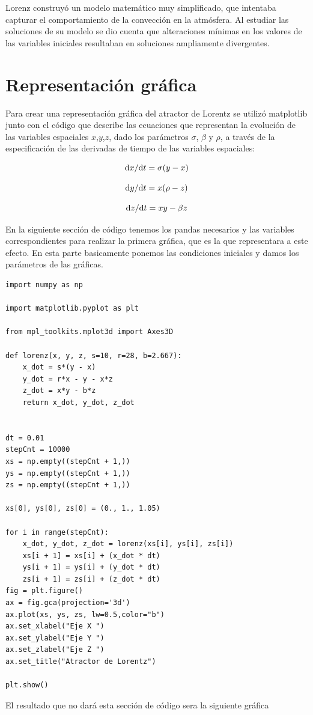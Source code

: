 Lorenz construyó un modelo matemático muy simplificado, que intentaba capturar el comportamiento de la convección en la atmósfera. Al estudiar las soluciones de su modelo se dio cuenta que alteraciones mínimas en los valores de las variables iniciales resultaban en soluciones ampliamente divergentes.
\newpage
\section{Representación gráfica}
\noindent Para crear una representación gráfica del atractor de Lorentz se utilizó matplotlib junto con el código que describe las ecuaciones que representan la evolución de las variables espaciales $x$,$y$,$z$, dado los parámetros $\sigma$, $\beta$ y $\rho$, a través de la especificación de las derivadas de tiempo de las variables espaciales:

$${\rm d}x/{\rm d}t=\sigma(y-x)$$

$${\rm d}y/{\rm d}t=x(\rho-z)$$

$${\rm d}z/{\rm d}t=xy-\beta z$$

En la siguiente sección de código tenemos los pandas necesarios y las variables correspondientes para realizar la primera gráfica, que es la que representara a este efecto. En esta parte basicamente ponemos las condiciones iniciales y damos los parámetros de las gráficas. 

\begin{verbatim}
import numpy as np

import matplotlib.pyplot as plt

from mpl_toolkits.mplot3d import Axes3D

def lorenz(x, y, z, s=10, r=28, b=2.667):
    x_dot = s*(y - x)
    y_dot = r*x - y - x*z
    z_dot = x*y - b*z
    return x_dot, y_dot, z_dot
    

dt = 0.01
stepCnt = 10000
xs = np.empty((stepCnt + 1,))
ys = np.empty((stepCnt + 1,))
zs = np.empty((stepCnt + 1,))

xs[0], ys[0], zs[0] = (0., 1., 1.05)

for i in range(stepCnt):
    x_dot, y_dot, z_dot = lorenz(xs[i], ys[i], zs[i])
    xs[i + 1] = xs[i] + (x_dot * dt)
    ys[i + 1] = ys[i] + (y_dot * dt)
    zs[i + 1] = zs[i] + (z_dot * dt)
fig = plt.figure()
ax = fig.gca(projection='3d')
ax.plot(xs, ys, zs, lw=0.5,color="b")
ax.set_xlabel("Eje X ")
ax.set_ylabel("Eje Y ")
ax.set_zlabel("Eje Z ")
ax.set_title("Atractor de Lorentz")

plt.show()

\end{verbatim}
 El resultado que no dará esta sección de código sera la siguiente gráfica
 
